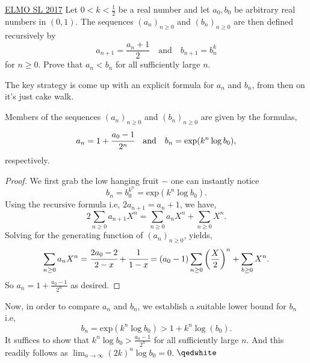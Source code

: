 \begin{problem}{4}{\href{https://artofproblemsolving.com/community/c6h1472062p8547108}{ELMO SL 2017}} Let $0<k<\frac{1}{2}$ be a real number and let $a_0, b_0$ be arbitrary real numbers in $(0,1)$. The sequences $(a_n)_{n\ge 0}$ and $(b_n)_{n\ge 0}$ are then defined recursively by
		$$a_{n+1} = \dfrac{a_n+1}{2} \quad\text{and}\quad b_{n+1} = b_n^k$$
		for $n\ge 0$. Prove that $a_n<b_n$ for all sufficiently large $n$.
	\begin{solution} The key strategy is come up with an explicit formula for $a_n$ and $b_n$, from then on it's just cake walk.
	\begin{claim}
		Members of the sequences $(a_n)_{n\ge 0}$ and $(b_n)_{n\ge 0}$ are given by the formulas,
		$$a_n=1+\cfrac{a_0-1}{2^n}\quad\text{and}\quad b_n=\text{exp}(k^n\log b_0),$$
	respectively.
	\end{claim}
	\begin{proof} We first grab the low hanging fruit $-$ one can instantly notice $$b_n=b_0^{k^n}=\text{exp}(k^n\log b_0).$$ Using the recursive formula i.e, $2a_{n+1}=a_n+1$, we have,
	$$2\sum_{n\ge 0}a_{n+1}X^n=\sum_{n\ge 0}a_nX^n+\sum_{n\ge 0}X^n.$$
	Solving for the generating function of $(a_n)_{n\ge 0}$, yields,	$$\sum_{n\ge 0}a_nX^n=\cfrac{2a_0-2}{2-x}+\cfrac{1}{1-x}=(a_0-1)\sum_{n\ge 0}\left(\frac{X}{2}\right)^n+\sum_{b\ge 0}X^n.$$
	So $a_n=1+\tfrac{a_0-1}{2^n}$ as desired.
	\end{proof}

	\indent Now, in order to compare $a_n$ and $b_n$, we establish a suitable lower bound for $b_n$ i.e,
	$$b_n=\text{exp}(k^n\log b_0)> 1+k^n\log(b_0).$$
	It suffices to show that $k^n\log b_0>\tfrac{a_0-1}{2^n}$ for all sufficiently large $n$. And this readily follows as $\lim_{n\to \infty}(2k)^n\log b_0=0$. $\qedwhite$ 
	\end{solution}
\end{problem}
